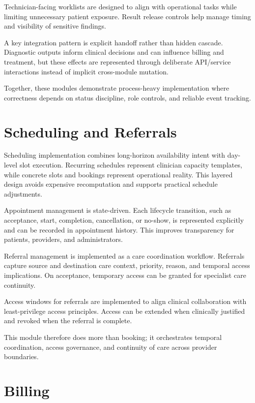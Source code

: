 Technician-facing worklists are designed to align with operational tasks while limiting unnecessary patient exposure. Result release controls help manage timing and visibility of sensitive findings.

A key integration pattern is explicit handoff rather than hidden cascade. Diagnostic outputs inform clinical decisions and can influence billing and treatment, but these effects are represented through deliberate API/service interactions instead of implicit cross-module mutation.

Together, these modules demonstrate process-heavy implementation where correctness depends on status discipline, role controls, and reliable event tracking.

\section{Scheduling and Referrals}\label{511-scheduling-and-referrals}

Scheduling implementation combines long-horizon availability intent with day-level slot execution. Recurring schedules represent clinician capacity templates, while concrete slots and bookings represent operational reality. This layered design avoids expensive recomputation and supports practical schedule adjustments.

Appointment management is state-driven. Each lifecycle transition, such as acceptance, start, completion, cancellation, or no-show, is represented explicitly and can be recorded in appointment history. This improves transparency for patients, providers, and administrators.

Referral management is implemented as a care coordination workflow. Referrals capture source and destination care context, priority, reason, and temporal access implications. On acceptance, temporary access can be granted for specialist care continuity.

Access windows for referrals are implemented to align clinical collaboration with least-privilege access principles. Access can be extended when clinically justified and revoked when the referral is complete.

This module therefore does more than booking; it orchestrates temporal coordination, access governance, and continuity of care across provider boundaries.

\section{Billing}\label{512-billing}

